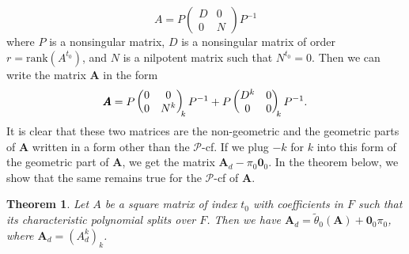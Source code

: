 \documentclass[12pt]{amsart}
\newtheorem{thrm}{Theorem}[section]
\theoremstyle{definition}
\numberwithin{equation}{section}
\numberwithin{equation}{section}
\begin{document}
$$A=P\begin{pmatrix} D&0\\ 0&N \end{pmatrix}P^{-1}$$
where $P$ is a nonsingular matrix, $D$ is a nonsingular matrix of order $r=\text{rank}(A^{t_{0}})$, and $N$ is a
nilpotent matrix such that $N^{t_{0}}=0$. Then we can write the matrix $\pmb{A}$ in the form
$$\pmb{A}=P\begin{pmatrix} 0&0\\ 0&N^{k} \end{pmatrix}_{\hspace*{-0.2pc} k}P^{-1} + P\begin{pmatrix} D^{k}&0\\ 0&0 \end{pmatrix}_{\hspace*{-0.2pc} k}P^{-1}.$$
It is clear that these two matrices are the non-geometric and the geometric parts of $\pmb{A}$ written in a form other than the $\mathcal{P}$-cf. If we plug $-k$ for $k$ into this form of the geometric part of $\pmb{A}$, we get the matrix $\pmb{A}_{d}-\pi_{0}\pmb{0}_{0}$. In the theorem below, we show that the same remains true for the $\mathcal{P}$-cf of $\pmb{A}$.
\begin{thrm}\label{thm 535}
Let $A$ be a square matrix of index $t_{0}$ with coefficients in $F$ such that its characteristic polynomial splits over $F$. Then we have $\pmb{A}_{d}=\widetilde{\theta}_{0}(\pmb{A})+\pmb{0}_{0}\pi_{0}$, where $\pmb{A}_{d}=(A_{d}^{k})_{k}$.
\end{thrm}
\end{document}

